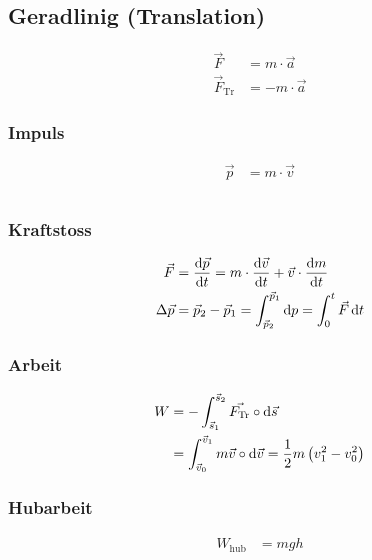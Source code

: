 \subsection{Geradlinig (Translation)}
\begin{align*}
\vec{F}&=m\cdot \vec{a}\\
\vec{F}_{\text{Tr}}&=-m\cdot \vec{a}
\end{align*}
\begin{multicols}{2}{}
\subsubsection*{Impuls}
\begin{align*}
\vec{p}&=m\cdot \vec{v}\\ \\
\end{align*}

\subsubsection*{Kraftstoss}
\begin{align*}
\vec{F}&=\frac{\diff \vec{p}}{\diff t}=m\cdot\frac{\diff \vec{v}}{\diff t}+\vec{v}\cdot\frac{\diff m}{\diff t}\\
\Delta\vec{p}&=\vec{p}_2-\vec{p}_1=\int_{\vec{p}_2}^{\vec{p}_1}\diff p=\int_0^{t}\vec{F}\diff t
\end{align*}
\end{multicols}

\begin{multicols}{2}{}
\subsubsection*{Arbeit}
\begin{align*}
W&=-\int_{\vec{s}_1}^{\vec{s}_2}\vec{F_{\text{Tr}}}\circ\mathop{}\!\mathrm{d} \vec{s}\\
&=\int_{\vec{v}_0}^{\vec{v}_1}m\vec{v}\circ\mathop{}\!\mathrm{d} \vec{v}=\frac{1}{2}m\left(v_1^2-v_0^2\right) 
\end{align*}

\subsubsection*{Hubarbeit}
\begin{align*}
W_{\text{hub}}&=mgh
\end{align*}
\end{multicols}

